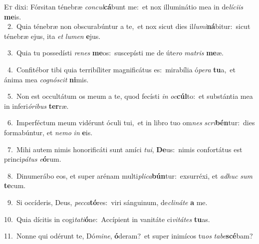 \lettrine{\initial\textcolor{\initialcolor}{E}}{t} dixi: Fórsitan ténebræ \textit{con}\-\textit{cul}\textbf{cá}bunt me:~\star et nox illuminátio mea in de\-\textit{lí}\-\textit{ci}\textit{is} \textbf{me}\-is.\\
{\numbfont\textcolor{\numbcolor}{~2.}}~Quia ténebræ non obscurabúntur a te,~\dagger et nox sicut dies il\-\textit{lu}\-\textit{mi}\textbf{ná}bitur:~\star sicut ténebræ ejus, ita \textit{et} \textit{lu}\-\textit{men} \textbf{e}\-jus.\par
{\numbfont\textcolor{\numbcolor}{~3.}}~Quia tu possedísti \textit{re}\-\textit{nes} \textbf{me}\-os:~\star suscepísti me de úte\textit{ro} \textit{ma}\-\textit{tris} \textbf{me}\-æ.\par
{\numbfont\textcolor{\numbcolor}{~4.}}~Confitébor tibi quia terribíliter magnificátus es:~\dagger mirabília ó\-\textit{pe}\-\textit{ra} \textbf{tu}\-a,~\star et ánima mea \textit{co}\-\textit{gnó}\textit{scit} \textbf{ni}\-mis.\par
{\numbfont\textcolor{\numbcolor}{~5.}}~Non est occultátum os meum a te, quod fecísti \textit{in} \textit{oc}\-\textbf{cúl}to:~\star et substántia mea in inferi\-\textit{ó}\-\textit{ri}\textit{bus} \textbf{ter}\-ræ.\par
{\numbfont\textcolor{\numbcolor}{~6.}}~Imperféctum meum vidérunt óculi tui,~\dagger et in libro tuo om\textit{nes} \textit{scri}\-\textbf{bén}tur:~\star dies formabúntur, et \textit{ne}\-\textit{mo} \textit{in} \textbf{e}\-is.\par
{\numbfont\textcolor{\numbcolor}{~7.}}~Mihi autem nimis honorificáti sunt amíci \textit{tu}\-\textit{i}, \textbf{De}\-us:~\star nimis confortátus est princi\-\textit{pá}\-\textit{tus} \textit{e}\-\textbf{ó}rum.\par
{\numbfont\textcolor{\numbcolor}{~8.}}~Dinumerábo eos, et super arénam multi\-\textit{pli}\-\textit{ca}\textbf{bún}tur:~\star exsurréxi, et \textit{ad}\-\textit{huc} \textit{sum} \textbf{te}\-cum.\par
{\numbfont\textcolor{\numbcolor}{~9.}}~Si occíderis, Deus, \textit{pec}\-\textit{ca}\textbf{tó}res:~\star viri sánguinum, de\-\textit{cli}\-\textit{ná}\textit{te} \textbf{a} me.\par
{\numbfont\textcolor{\numbcolor}{10.}}~Quia dícitis in cogi\-\textit{ta}\-\textit{ti}\textbf{ó}ne:~\star Accípient in vanitáte ci\-\textit{vi}\-\textit{tá}\textit{tes} \textbf{tu}\-as.\par
{\numbfont\textcolor{\numbcolor}{11.}}~Nonne qui odérunt te, Dó\-\textit{mi}\-\textit{ne}, \textbf{ó}\-deram?~\star et super inimícos tu\textit{os} \textit{ta}\-\textit{be}\textbf{scé}bam?\par
